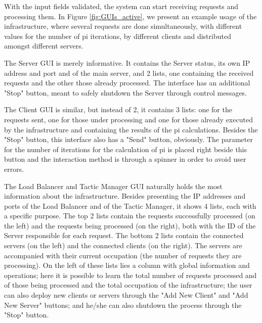 \documentclass[12pt]{article}
\begin{document}
With the input fields validated, the system can start receiving requests and processing them.
In Figure \ref{fig:GUIs_active}, we present an example usage of the infrastructure, where several requests are done simultaneously, with different values for the 
number of pi iterations, by different clients and distributed amongst different servers.

The Server GUI is merely informative.
It contains the Server status, its own IP address and port and of the main server, and 2 lists, one containing the received requests and the other those 
already processed.
The interface has an additional "Stop" button, meant to safely shutdown the Server through control messages.

The Client GUI is similar, but instead of 2, it contains 3 lists: one for the requests sent, one for those under processing and one for those already 
executed by the infrastructure and containing the results of the pi calculations.
Besides the "Stop" button, this interface also has a "Send" button, obviously.
The parameter for the number of iterations for the calculation of pi is placed right beside this button and the interaction method is through a spinner in order 
to avoid user errors.

The Load Balancer and Tactic Manager GUI naturally holds the most information about the infrastructure.
Besides presenting the IP addresses and ports of the Load Balancer and of the Tactic Manager, it shows 4 lists, each with a specific purpose.
The top 2 lists contain the requests successfully processed (on the left) and the requests being processed (on the right), both with the ID of the Server 
responsible for each request.
The bottom 2 lists contain the connected servers (on the left) and the connected clients (on the right).
The servers are accompanied with their current occupation (the number of requests they are processing).
On the left of these lists lies a column with global information and operations; here it is possible to learn the total number of requests processed and of 
those being processed and the total occupation of the infrastructure; the user can also deploy new clients or servers through the "Add New Client" and "Add New
Server" buttons; and he/she can also shutdown the process through the "Stop" button.
\end{document}
